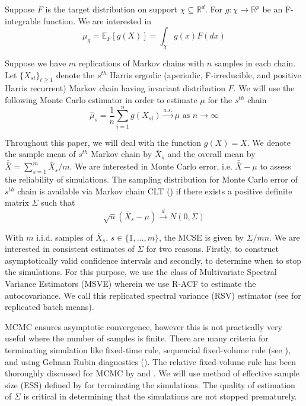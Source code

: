 \documentclass[11pt]{article}
\theoremstyle{remark}
\begin{document}
Suppose $F$ is the target distribution on support $\chi \subseteq \mathbb{R}^d$. For $g:\chi \longrightarrow \mathbb{R}^p$ be an F-integrable function. We are interested in
%
\[
\mu_g = \mathbb{E}_F[g(X)] = \int_{\chi}g(x)F(dx)
\]

Suppose we have $m$ replications of Markov chains with $n$ samples in each chain. Let $\{X_{st}\}_{t \geq 1}$ denote the $s^{th}$ Harris ergodic (aperiodic, F-irreducible, and positive Harris recurrent) Markov chain having invariant distribution $F$. We will use the following Monte Carlo estimator in order to estimate $\mu$ for the $s^{th}$ chain
%
\[
\hat{\mu}_s = \dfrac{1}{n}\sum_{i = 1}^{n} g(X_{si}) \xrightarrow{a.s.} \mu \textrm{ as } n \to \infty
\]

Throughout this paper, we will deal with the function $g(X) = X$. We denote the sample mean of $s^{th}$ Markov chain by $\bar{X}_s$ and the overall mean by $\bar{\bar{X}} = \sum_{s = 1}^{m}\bar{X}_s/m$. We are interested in Monte Carlo error, i.e. $\bar{\bar{X}} - \mu$ to assess the reliability of simulations. The sampling distribution for Monte Carlo error of $s^{th}$ chain is available via Markov chain CLT (\cite{jones2004markov}) if there exists a positive definite matrix $\Sigma$ such that
%
\[
\sqrt{n}(\bar{X}_s-\mu) \xrightarrow{d} N(0,\Sigma)
\]

 With $m$ i.i.d. samples of $\bar{X}_s$, $s \in \{1,..., m\}$, the MCSE is given by $\Sigma/mn$. We are interested in consistent estimates of $\Sigma$ for two reasons. Firstly, to construct asymptotically valid confidence intervals and secondly, to determine when to stop the simulations. For this purpose, we use the class of Multivariate Spectral Variance Estimators (MSVE) wherein we use R-ACF to estimate the autocovariance. We call this replicated spectral variance (RSV) estimator (see \cite{arg:and:2006} for replicated batch means). 
 
MCMC ensures asymptotic convergence, however this is not practically very useful where the number of samples is finite. There are many criteria for terminating simulation like fixed-time rule, sequencial fixed-volume rule (see \cite{glynn1992asymptotic}), and using Gelman Rubin diagnostics (\cite{gelman1992inference}). The relative fixed-volume rule has been thoroughly discussed for MCMC by \cite{flegal2015relative} and \cite{gong2016practical}. We will use method of effective sample size (ESS) defined by \cite{vats2019multivariate} for terminating the simulations. The quality of estimation of $\Sigma$ is critical in determining that the simulations are not stopped prematurely. 
 
\end{document}
